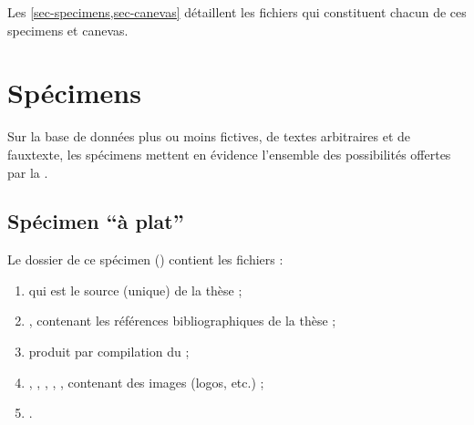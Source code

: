 Les \vref{sec-specimens,sec-canevas} détaillent les fichiers qui constituent
chacun de ces specimens et canevas.




\section{Spécimens}
\label{sec-specimens}

Sur la base de données plus ou moins fictives, de textes arbitraires et de
\gls{fauxtexte}, les spécimens mettent en évidence l'ensemble des possibilités
offertes par la \yatcl{}.

\subsection{Spécimen \enquote{à plat}}
\label{sec-specimen-a-plat}

\def\folder{specimens}
\def\subfolder{a-plat}

Le dossier de ce spécimen (\directory{.../\folder/}\subdirectorytree) contient
les fichiers :
\begin{enumerate}
\item {} qui est le source  (unique) de la thèse ;
\item {}, contenant les références bibliographiques de
  la thèse ;
\item {} produit par compilation du  ;
\item {}, , , ,
  , contenant des images (logos, etc.) ;
\item {}\latexmkrc.
\end{enumerate}

